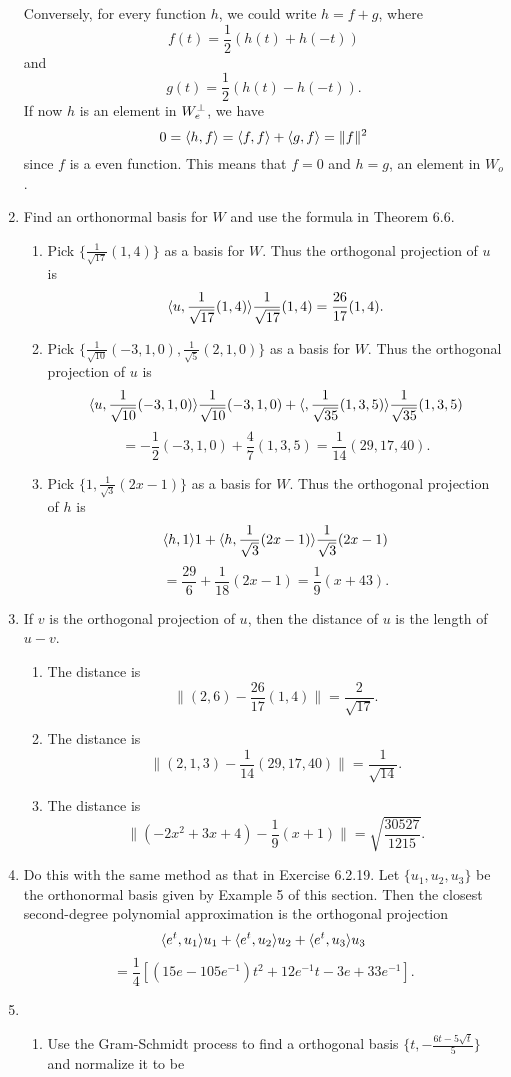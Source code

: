 \begin{enumerate}
Conversely, for every function $h$, we could write $h=f+g$, where 
\[f(t)=\frac{1}{2}(h(t)+h(-t))\] and 
\[g(t)=\frac{1}{2}(h(t)-h(-t)).\]
If now $h$ is an element in $W_e^{\perp}$, we have 
\[0=\langle h,f\rangle =\langle f,f\rangle +\langle g,f\rangle=\|f\|^2\]
since $f$ is a even function. This means that $f=0$ and $h=g$, an element in $W_o$.
\item Find an orthonormal basis for $W$ and use the formula in Theorem 6.6.
\begin{enumerate}
\item Pick $\{\frac{1}{\sqrt{17}}(1,4)\}$ as a basis for $W$. Thus the orthogonal projection of $u$ is 
\[\langle u,\frac{1}{\sqrt{17}}(1,4)\rangle \frac{1}{\sqrt{17}}(1,4)=\frac{26}{17}(1,4).\]
\item Pick $\{\frac{1}{\sqrt{10}}(-3,1,0),\frac{1}{\sqrt{5}}(2,1,0)\}$ as a basis for $W$. Thus the orthogonal projection of $u$ is 
\[\langle u,\frac{1}{\sqrt{10}}(-3,1,0)\rangle \frac{1}{\sqrt{10}}(-3,1,0)+\langle,\frac{1}{\sqrt{35}}(1,3,5)\rangle \frac{1}{\sqrt{35}}(1,3,5)\]
\[=-\frac{1}{2}(-3,1,0)+\frac{4}{7}(1,3,5)=\frac{1}{14}(29,17,40).\]
\item Pick $\{1,\frac{1}{\sqrt{3}}(2x-1)\}$ as a basis for $W$. Thus the orthogonal projection of $h$ is 
\[\langle h,1\rangle 1+\langle h,\frac{1}{\sqrt{3}}(2x-1)\rangle \frac{1}{\sqrt{3}}(2x-1)\]
\[=\frac{29}{6}+\frac{1}{18}(2x-1)=\frac{1}{9}(x+43).\]
\end{enumerate}
\item If $v$ is the orthogonal projection of $u$, then the distance of $u$ is the length of $u-v$.
\begin{enumerate}
\item The distance is 
\[\|(2,6)-\frac{26}{17}(1,4)\|=\frac{2}{\sqrt{17}}.\]
\item The distance is 
\[\|(2,1,3)-\frac{1}{14}(29,17,40)\|=\frac{1}{\sqrt{14}}.\]
\item The distance is 
\[\|(-2x^2+3x+4)-\frac{1}{9}(x+1)\|=\sqrt{\frac{30527}{1215}}.\]
\end{enumerate}
\item Do this with the same method as that in Exercise 6.2.19. Let $\{u_1,u_2,u_3\}$ be the orthonormal basis given by Example 5 of this section. Then the closest second-degree polynomial approximation is the orthogonal projection 
\[\langle e^t,u_1\rangle u_1+\langle e^t,u_2\rangle u_2+\langle e^t,u_3\rangle u_3\]
\[=\frac{1}{4}[(15e-105e^{-1})t^2+12e^{-1}t-3e+33e^{-1}].\]
\item \begin{enumerate}
\item Use the Gram-Schmidt process to find a orthogonal basis $\{t,-\frac{6t-5\sqrt{t}}{5}\}$ and normalize it to be 

\end{enumerate}
\end{enumerate}
